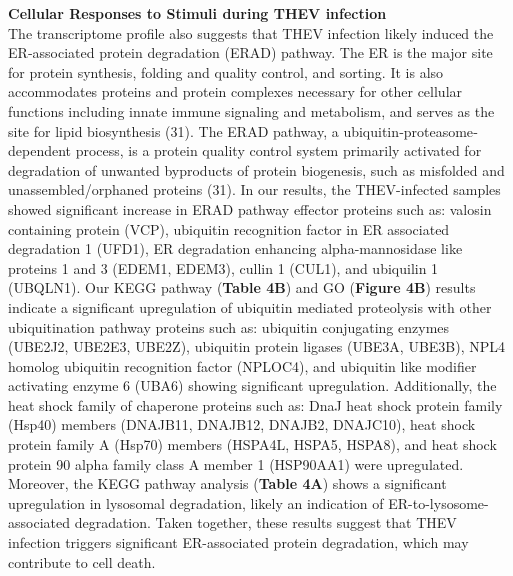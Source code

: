 \documentclass[
]{article}
\begin{document}
\textbf{Cellular Responses to Stimuli during THEV infection}\\
The transcriptome profile also suggests that THEV infection likely
induced the ER‐associated protein degradation (ERAD) pathway. The ER is
the major site for protein synthesis, folding and quality control, and
sorting. It is also accommodates proteins and protein complexes
necessary for other cellular functions including innate immune signaling
and metabolism, and serves as the site for lipid biosynthesis (31). The
ERAD pathway, a ubiquitin‐proteasome‐dependent process, is a protein
quality control system primarily activated for degradation of unwanted
byproducts of protein biogenesis, such as misfolded and
unassembled/orphaned proteins (31). In our results, the THEV-infected
samples showed significant increase in ERAD pathway effector proteins
such as: valosin containing protein (VCP), ubiquitin recognition factor
in ER associated degradation 1 (UFD1), ER degradation enhancing
alpha-mannosidase like proteins 1 and 3 (EDEM1, EDEM3), cullin 1 (CUL1),
and ubiquilin 1 (UBQLN1). Our KEGG pathway (\textbf{Table 4B}) and GO
(\textbf{Figure 4B}) results indicate a significant upregulation of
ubiquitin mediated proteolysis with other ubiquitination pathway
proteins such as: ubiquitin conjugating enzymes (UBE2J2, UBE2E3, UBE2Z),
ubiquitin protein ligases (UBE3A, UBE3B), NPL4 homolog ubiquitin
recognition factor (NPLOC4), and ubiquitin like modifier activating
enzyme 6 (UBA6) showing significant upregulation. Additionally, the heat
shock family of chaperone proteins such as: DnaJ heat shock protein
family (Hsp40) members (DNAJB11, DNAJB12, DNAJB2, DNAJC10), heat shock
protein family A (Hsp70) members (HSPA4L, HSPA5, HSPA8), and heat shock
protein 90 alpha family class A member 1 (HSP90AA1) were upregulated.
Moreover, the KEGG pathway analysis (\textbf{Table 4A}) shows a
significant upregulation in lysosomal degradation, likely an indication
of ER-to-lysosome-associated degradation. Taken together, these results
suggest that THEV infection triggers significant ER-associated protein
degradation, which may contribute to cell death.
\end{document}

